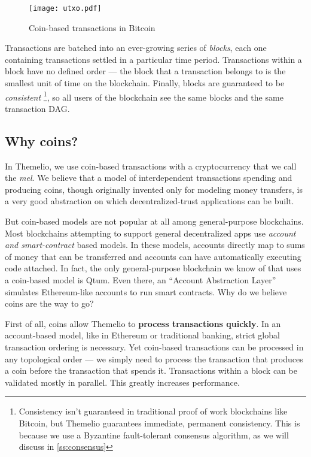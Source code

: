 \documentclass[headinclude,12pt]{scrbook}
\begin{document}
\begin{figure}
    \centering \texttt{[image: utxo.pdf]}
    \caption{Coin-based transactions in Bitcoin}
    \label{fig:utxo}
\end{figure}


Transactions are batched into an ever-growing series of \emph{blocks}, each one containing transactions settled in a particular time period. Transactions within a block have no defined order --- the block that a transaction belongs to is the smallest unit of time on the blockchain. Finally, blocks are guaranteed to be \emph{consistent} \footnote{Consistency isn't guaranteed in traditional proof of work blockchains like Bitcoin, but Themelio guarantees immediate, permanent consistency. This is because we use a Byzantine fault-tolerant consensus algorithm, as we will discuss in \ref{ss:consensus}}, so all users of the blockchain see the same blocks and the same transaction DAG.

\subsection{Why coins?}

In Themelio, we use coin-based transactions with a cryptocurrency that we call the \emph{mel}. We believe that a model of interdependent transactions spending and producing coins, though originally invented only for modeling money transfers, is a very good abstraction on which decentralized-trust applications can be built.

But coin-based models are not popular at all among general-purpose blockchains. Most blockchains attempting to support general decentralized apps use \emph{account and smart-contract} based models. In these models, accounts directly map to sums of money that can be transferred and accounts can have automatically executing code attached. In fact, the only general-purpose blockchain we know of that uses a coin-based model is Qtum. Even there, an ``Account Abstraction Layer'' simulates Ethereum-like accounts to run smart contracts. Why do we believe coins are the way to go?

First of all, coins allow Themelio to \textbf{process transactions quickly}. In an account-based model, like in Ethereum or traditional banking, strict global transaction ordering is necessary. Yet coin-based transactions can be processed in any topological order --- we simply need to process the transaction that produces a coin before the transaction that spends it. Transactions within a block can be validated mostly in parallel. This greatly increases performance.
\end{document}

